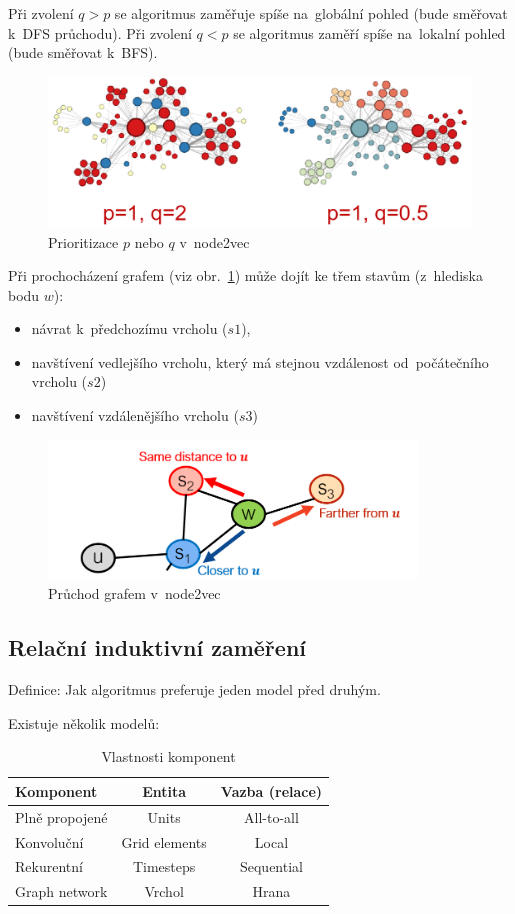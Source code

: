 Při zvolení $q>p$ se algoritmus zaměřuje spíše na~globální pohled (bude směřovat k~DFS průchodu). Při zvolení $q<p$ se algoritmus zaměří spíše na~lokalní pohled (bude směřovat k~BFS).

\begin{figure}[ht]
    \centering
	\includegraphics[width=\textwidth]{images/11_node2vec-pq}
    \caption{Prioritizace $p$ nebo $q$ v~node2vec}
\end{figure}

Při prochocházení grafem (viz obr.~\ref{pruchod-node2vec}) může dojít ke třem stavům (z~hlediska bodu $w$):
\begin{itemize}
	\item návrat k~předchozímu vrcholu ($s1$),
	\item navštívení vedlejšího vrcholu, který má stejnou vzdálenost od~počátečního vrcholu ($s2$)
	\item navštívení vzdálenějšího vrcholu ($s3$)
\end{itemize}

\begin{figure}
    \centering
	\includegraphics[height=10em]{images/node2vec.png}
    \caption{Průchod grafem v~node2vec}
    \label{pruchod-node2vec}
\end{figure}

\subsection{Relační induktivní zaměření}

Definice: Jak algoritmus preferuje jeden model před druhým. 

Existuje několik modelů:
\begin{table}[ht]
\centering
\caption{Vlastnosti komponent}
\begin{tabular}{|l|c|c|}
\hline
Komponent & Entita & Vazba (relace) \\ \hline \hline
Plně propojené & Units & All-to-all \\ \hline
Konvoluční & Grid elements & Local \\ \hline
Rekurentní & Timesteps & Sequential \\ \hline
Graph network & Vrchol & Hrana \\ \hline
\end{tabular}
\end{table}

